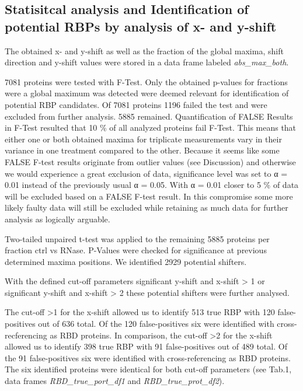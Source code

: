 \documentclass[
]{article}
\begin{document}
\hypertarget{statisitcal-analysis-and-identification-of-potential-rbps-by-analysis-of-x--and-y-shift}{%
\subsection{Statisitcal analysis and Identification of potential RBPs by
analysis of x- and
y-shift}\label{statisitcal-analysis-and-identification-of-potential-rbps-by-analysis-of-x--and-y-shift}}

The obtained x- and y-shift as well as the fraction of the global
maxima, shift direction and y-shift values were stored in a data frame
labeled \emph{abs\_max\_both}.

7081 proteins were tested with F-Test. Only the obtained p-values for
fractions were a global maximum was detected were deemed relevant for
identification of potential RBP candidates. Of 7081 proteins 1196 failed
the test and were excluded from further analysis. 5885 remained.
Quantification of FALSE Results in F-Test resulted that 10 \% of all
analyzed proteins fail F-Test. This means that either one or both
obtained maxima for triplicate measurements vary in their variance in
one treatment compared to the other. Because it seems like some FALSE
F-test results originate from outlier values (see Discussion) and
otherwise we would experience a great exclusion of data, significance
level was set to α = 0.01 instead of the previously usual α = 0.05. With
α = 0.01 closer to 5 \% of data will be excluded based on a FALSE F-test
result. In this compromise some more likely faulty data will still be
excluded while retaining as much data for further analysis as logically
arguable.

Two-tailed unpaired t-test was applied to the remaining 5885 proteins
per fraction ctrl vs RNase. P-Values were checked for significance at
previous determined maxima positions. We identified 2929 potential
shifters.

With the defined cut-off parameters significant y-shift and x-shift
\textgreater{} 1 or significant y-shift and x-shift \textgreater{} 2
these potential shifters were further analysed.

The cut-off \textgreater1 for the x-shift allowed us to identify 513
true RBP with 120 false-positives out of 636 total. Of the 120
false-positives six were identified with cross-recferencing as RBD
proteins. In comparison, the cut-off \textgreater2 for the x-shift
allowed us to identify 398 true RBP with 91 false-positives out of 489
total. Of the 91 false-positives six were identified with
cross-referencing as RBD proteins. The six identified proteins were
identical for both cut-off parameters (see Tab.1, data frames
\emph{RBD\_true\_port\_df1} and \emph{RBD\_true\_prot\_df2}).
\end{document}
